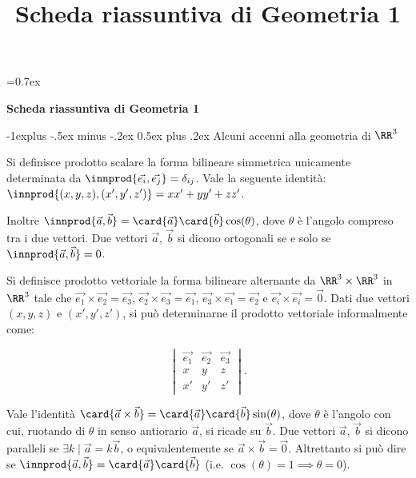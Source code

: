\documentclass[10pt,landscape]{article}
\title{Scheda riassuntiva di Geometria 1}
\makeatletter
\renewcommand{\subsection}{\@startsection{subsection}{2}{0mm}%
	{-1explus -.5ex minus -.2ex}%
	{0.5ex plus .2ex}%
	{\normalfont\normalsize\bfseries}}
\makeatother
\begin{document}
	
	\parskip=0.7ex
	
	\raggedright
	\footnotesize
	
	\begin{center}
		\Large{\textbf{Scheda riassuntiva di Geometria 1}} \\
	\end{center}
	\begin{multicols}{3}
		\setlength{\premulticols}{1pt}
		\setlength{\postmulticols}{1pt}
		\setlength{\multicolsep}{1pt}
		\setlength{\columnsep}{2pt}
		
		\subsection{Alcuni accenni alla geometria di \texorpdfstring{$\RR^3$}{R\^{}3}}
		
		Si definisce prodotto scalare la forma
		bilineare simmetrica unicamente determinata da $\innprod{\vec{e_i}, \vec{e_j}} = \delta_{ij}$. Vale la seguente identità: $\innprod{(x, y, z), (x', y', z')} = xx' + yy' + zz'$.
		
		Inoltre $\innprod{\vec{a}, \vec{b}} = \card{\vec{a}} \card{\vec{b}} \cos(\theta)$, dove $\theta$ è l'angolo compreso tra i due vettori.
		Due vettori $\vec{a}$, $\vec{b}$ si dicono ortogonali
		se e solo se $\innprod{\vec{a}, \vec{b}} = 0$.
		
		Si definisce prodotto vettoriale la forma bilineare alternante
		da $\RR^3 \times \RR^3$
		in $\RR^3$ tale che $\vec{e_1} \times \vec{e_2} = \vec{e_3}$,
		$\vec{e_2} \times \vec{e_3} = \vec{e_1}$,
		$\vec{e_3} \times \vec{e_1} = \vec{e_2}$ e
		$\vec{e_i} \times \vec{e_i} = \vec{0}$. Dati due
		vettori $(x, y, z)$ e $(x', y', z')$, si può determinarne
		il prodotto vettoriale informalmente come:
		
		\[ \begin{vmatrix}
			\vec{e_1} & \vec{e_2} & \vec{e_3} \\
			x & y & z \\
			x' & y' & z'
		\end{vmatrix} . \]
		
		Vale l'identità $\card{\vec{a} \times \vec{b}} = \card{\vec{a}} \card{\vec{b}} \sin(\theta)$, dove $\theta$ è l'angolo con cui, ruotando di
		$\theta$ in senso antiorario $\vec{a}$, si ricade su $\vec{b}$.
		Due vettori $\vec{a}$, $\vec{b}$ si dicono paralleli se $\exists
		k \mid \vec{a} = k \vec{b}$, o equivalentemente se
		$\vec{a} \times \vec{b} = \vec{0}$. Altrettanto si può dire
		se $\innprod{\vec{a}, \vec{b}} = \card{\vec{a}} \card{\vec{b}}$ (i.e.
		$\cos(\theta) = 1 \implies \theta = 0$).
		

\end{multicols}
\end{document}
